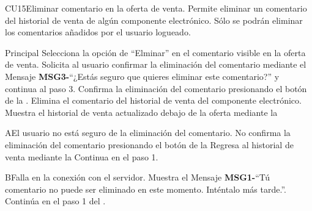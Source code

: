 \begin{UseCase}{CU15}{Eliminar comentario en la oferta de venta.}{
		Permite eliminar un comentario del historial de venta de algún componente electrónico. Sólo se podrán eliminar los comentarios añadidos por el usuario logueado.
	}
		
	\end{UseCase}

	\begin{UCtrayectoria}{Principal}
		\UCpaso[\UCactor] Selecciona la opción de ``Elminar'' en el comentario visible en la oferta de venta.
		\UCpaso Solicita al usuario confirmar la eliminación del comentario mediante el Mensaje {\bf MSG3-}``¿Estás seguro que quieres eliminar este comentario?'' y continua al paso 3.
		\UCpaso[\UCactor] Confirma la eliminación del comentario presionando el botón  de la   .
		\UCpaso Elimina el comentario del historial de venta del componente electrónico.
		\UCpaso Muestra el historial de venta actualizado debajo de la oferta mediante la 
\end{UCtrayectoria}
		\begin{UCtrayectoriaA}{A}{El usuario no está seguro de la eliminación del comentario.}
    		\UCpaso[\UCactor] No confirma la eliminación del comentario presionando el botón  de la 
			\UCpaso Regresa al historial de venta mediante la 
			\UCpaso Continua en el paso 1.
		\end{UCtrayectoriaA}
		
		\begin{UCtrayectoriaA}{B}{Falla en la conexión con el servidor.}
			\UCpaso Muestra el Mensaje {\bf MSG1-}``Tú comentario no puede ser eliminado en este momento. Inténtalo más tarde.''.
			\UCpaso Continúa en el paso 1 del .
		\end{UCtrayectoriaA}
		
		
		

